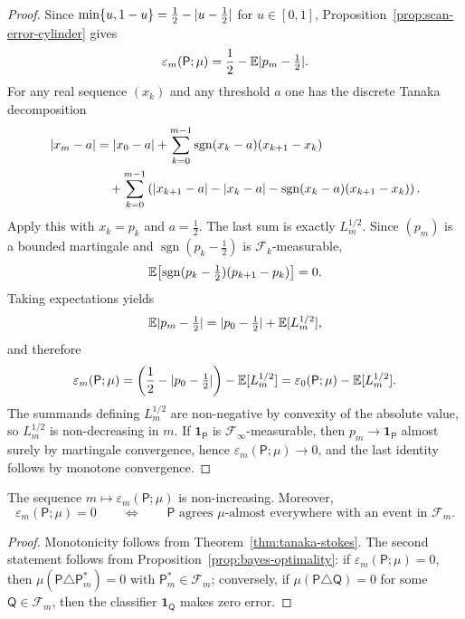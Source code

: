 \begin{proof}
Since \(\min\{u,1-u\}=\tfrac12-\lvert u-\tfrac12\rvert\) for \(u\in[0,1]\),
Proposition~\ref{prop:scan-error-cylinder} gives
\[
  \varepsilon_m(\mathsf{P};\mu)
  = \frac12 - \mathbb{E}\lvert p_m-\tfrac12\rvert.
\]
For any real sequence \((x_k)\) and any threshold \(a\) one has the
discrete Tanaka decomposition
\begin{align*}
  \lvert x_m-a\rvert
  &= \lvert x_0-a\rvert
     + \sum_{k=0}^{m-1}
       \operatorname{sgn}(x_k-a)(x_{k+1}-x_k) \\
  &\quad
     + \sum_{k=0}^{m-1}
       \left(
         \lvert x_{k+1}-a\rvert
         - \lvert x_k-a\rvert
         - \operatorname{sgn}(x_k-a)(x_{k+1}-x_k)
       \right).
\end{align*}
Apply this with \(x_k=p_k\) and \(a=\tfrac12\).  The last sum is
exactly \(L_m^{1/2}\).  Since \((p_m)\) is a bounded martingale and
\(\operatorname{sgn}(p_k-\tfrac12)\) is \(\mathcal{F}_k\)-measurable,
\[
  \mathbb{E}\!\left[
    \operatorname{sgn}(p_k-\tfrac12)(p_{k+1}-p_k)
  \right]
  = 0.
\]
Taking expectations yields
\[
  \mathbb{E}\lvert p_m-\tfrac12\rvert
  = \lvert p_0-\tfrac12\rvert + \mathbb{E}[L_m^{1/2}],
\]
and therefore
\[
  \varepsilon_m(\mathsf{P};\mu)
  = \left(\frac12-\lvert p_0-\tfrac12\rvert\right)
    - \mathbb{E}[L_m^{1/2}]
  = \varepsilon_0(\mathsf{P};\mu)-\mathbb{E}[L_m^{1/2}].
\]
The summands defining \(L_m^{1/2}\) are non-negative by convexity of the
absolute value, so \(L_m^{1/2}\) is non-decreasing in \(m\).  If
\(\mathbf{1}_{\mathsf{P}}\) is \(\mathcal{F}_\infty\)-measurable, then
\(p_m\to \mathbf{1}_{\mathsf{P}}\) almost surely by martingale
convergence, hence \(\varepsilon_m(\mathsf{P};\mu)\to 0\), and the last
identity follows by monotone convergence.
\end{proof}

\begin{corollary}\label{cor:clarity-monotone}
The sequence \(m\mapsto \varepsilon_m(\mathsf{P};\mu)\) is
non-increasing.  Moreover,
\[
  \varepsilon_m(\mathsf{P};\mu)=0
  \qquad\Longleftrightarrow\qquad
  \mathsf{P}\text{ agrees \(\mu\)-almost everywhere with an event in }
  \mathcal{F}_m.
\]
\end{corollary}

\begin{proof}
Monotonicity follows from Theorem~\ref{thm:tanaka-stokes}.  The second
statement follows from Proposition~\ref{prop:bayes-optimality}: if
\(\varepsilon_m(\mathsf{P};\mu)=0\), then
\(\mu(\mathsf{P}\triangle \mathsf{P}_m^\ast)=0\) with
\(\mathsf{P}_m^\ast\in\mathcal{F}_m\); conversely, if
\(\mu(\mathsf{P}\triangle \mathsf{Q})=0\) for some
\(\mathsf{Q}\in\mathcal{F}_m\), then the classifier
\(\mathbf{1}_{\mathsf{Q}}\) makes zero error.
\end{proof}

